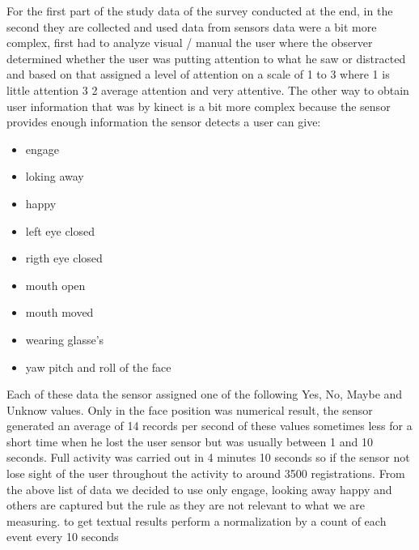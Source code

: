 \documentclass[journal]{IEEEtran}
\begin{document}
For the first part of the study data of the survey conducted at the end, in the second they are collected and used data from sensors data were a bit more complex, first had to analyze visual / manual the user where the observer determined whether the user was putting attention to what he saw or distracted and based on that assigned a level of attention on a scale of 1 to 3 where 1 is little attention 3 2 average attention and very attentive. The other way to obtain user information that was by kinect is a bit more complex because the sensor provides enough information the sensor detects a user can give:

\begin{itemize}
 \item engage
 \item loking away
 \item happy
 \item left eye closed
 \item rigth eye closed
 \item mouth open
 \item mouth moved 
 \item wearing glasse's
 \item yaw pitch and roll of the face
\end{itemize}


Each of these data the sensor assigned one of the following Yes, No, Maybe and Unknow values. Only in the face position was numerical result, the sensor generated an average of 14 records per second of these values sometimes less for a short time when he lost the user sensor but was usually between 1 and 10 seconds. Full activity was carried out in 4 minutes 10 seconds so if the sensor not lose sight of the user throughout the activity to around 3500 registrations. From the above list of data we decided to use only engage, looking away happy and others are captured but the rule as they are not relevant to what we are measuring. to get textual results perform a normalization by a count of each event every 10 seconds
\end{document}
